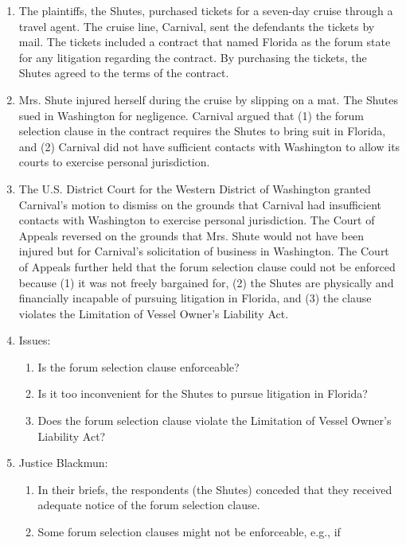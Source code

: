 \begin{enumerate}
    \item The plaintiffs, the Shutes, purchased tickets for a seven-day cruise 
    through a travel agent. The cruise line, Carnival, sent the defendants the 
    tickets by mail. The tickets included a contract that named Florida as the 
    forum state for any litigation regarding the contract. By purchasing the 
    tickets, the Shutes agreed to the terms of the contract.
    \item Mrs. Shute injured herself during the cruise by slipping on a mat.  
    The Shutes sued in Washington for negligence. Carnival argued that (1) the 
    forum selection clause in the contract requires the Shutes to bring suit 
    in Florida, and (2) Carnival did not have sufficient contacts with 
    Washington to allow its courts to exercise personal jurisdiction.
    \item The U.S. District Court for the Western District of Washington 
    granted Carnival's motion to dismiss on the grounds that Carnival had 
    insufficient contacts with Washington to exercise personal jurisdiction.  
    The Court of Appeals reversed on the grounds that Mrs. Shute would not 
    have been injured but for Carnival's solicitation of business in 
    Washington. The Court of Appeals further held that the forum selection 
    clause could not be enforced because (1) it was not freely bargained for, 
    (2) the Shutes are physically and financially incapable of pursuing 
    litigation in Florida, and (3) the clause violates the Limitation of 
    Vessel Owner's Liability Act.
    \item Issues:
    \begin{enumerate}
        \item Is the forum selection clause enforceable?
        \item Is it too inconvenient for the Shutes to pursue litigation in 
        Florida?
        \item Does the forum selection clause violate the Limitation of Vessel 
        Owner's Liability Act?
    \end{enumerate}
    \item Justice Blackmun:
    \begin{enumerate}
        \item In their briefs, the respondents (the Shutes) conceded that they 
        received adequate notice of the forum selection clause.
        \item Some forum selection clauses might not be enforceable, e.g., if 

\end{enumerate}
\end{enumerate}
